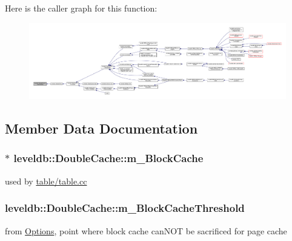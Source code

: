 Here is the caller graph for this function\+:
\nopagebreak
\begin{figure}[H]
\begin{center}
\leavevmode
\includegraphics[width=350pt]{classleveldb_1_1_double_cache_a21f96b1103106b8b94162088f0b784ab_icgraph}
\end{center}
\end{figure}




\subsection{Member Data Documentation}
\hypertarget{classleveldb_1_1_double_cache_a67c996a093cd657bc69d4d08a95c984e}{}
\subsubsection[{m\+\_\+\+Block\+Cache}]{$\ast$ leveldb\+::\+Double\+Cache\+::m\+\_\+\+Block\+Cache\hspace{0.3cm}{\ttfamily [protected]}}\label{classleveldb_1_1_double_cache_a67c996a093cd657bc69d4d08a95c984e}


used by \hyperlink{table_8cc}{table/table.\+cc} 

\hypertarget{classleveldb_1_1_double_cache_ae08930d00eff9d2423cbe49875fc2fff}{}
\subsubsection[{m\+\_\+\+Block\+Cache\+Threshold}]{ leveldb\+::\+Double\+Cache\+::m\+\_\+\+Block\+Cache\+Threshold\hspace{0.3cm}{\ttfamily [protected]}}\label{classleveldb_1_1_double_cache_ae08930d00eff9d2423cbe49875fc2fff}
from \hyperlink{structleveldb_1_1_options}{Options}, point where block cache can\+N\+O\+T be sacrificed for page cache \hypertarget{classleveldb_1_1_double_cache_aae6771693bdd6eef7171b146af5744ff}{}
